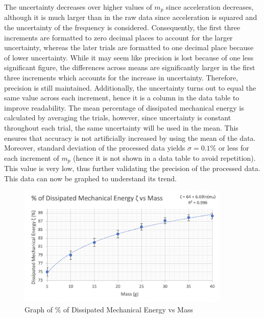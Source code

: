 \documentclass[11pt]{article}
\begin{document}
The uncertainty decreases over higher values of $m_p$ since acceleration decreases, although it is much larger than in the raw data since acceleration is squared and the uncertainty of the frequency is considered. Consequently, the first three increments are formatted to zero decimal places to account for the larger uncertainty, whereas the later trials are formatted to one decimal place because of lower uncertainty. While it may seem like precision is lost because of one less significant figure, the differences across means are significantly larger in the first three increments which accounts for the increase in uncertainty. Therefore, precision is still maintained. Additionally, the uncertainty turns out to equal the same value across each increment, hence it is a column in the data table to improve readability. The mean percentage of dissipated mechanical energy is calculated by averaging the trials, however, since uncertainty is constant throughout each trial, the same uncertainty will be used in the mean. This ensures that accuracy is not artificially increased by using the mean of the data.
\\



Moreover, standard deviation of the processed data yields $\sigma =0.1\%$ or less for each increment of $m_p$ (hence it is not shown in a data table to avoid repetition). This value is very low, thus further validating the precision of the processed data. This data can now be graphed to understand its trend.


\begin{figure}[h]
    \centering
    \includegraphics[width=0.9\textwidth]{img/graph1.png}
    \vspace{-20pt}
    \caption{Graph of \% of Dissipated Mechanical Energy vs Mass}
    \label{fig:6}
\end{figure}
\end{document}
